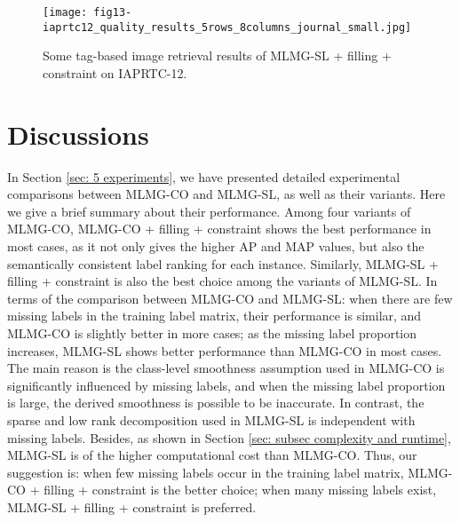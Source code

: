 \documentclass[twocolumn]{svjour3}          %
\begin{document}
\begin{figure*}[phtb]
\centering
\texttt{[image: fig13-iaprtc12\_quality\_results\_5rows\_8columns\_journal\_small.jpg]}
\vspace{-0.15in}
\caption{Some tag-based image retrieval results of MLMG-SL + filling + constraint on IAPRTC-12.}
\label{fig: quality results of image retrieval on iaprtc12}
\end{figure*}



\section{Discussions} \label{sec: discussion} 

In Section \ref{sec: 5 experiments}, we have presented detailed experimental comparisons between MLMG-CO and MLMG-SL, as well as their variants. 
Here we give a brief summary about their performance. 
%
Among four variants of MLMG-CO, MLMG-CO + filling + constraint shows the best performance in most cases, as it not only gives the higher AP and MAP values, but also the semantically consistent label ranking for each instance. 
Similarly, MLMG-SL + filling + constraint is also the best choice among the variants of MLMG-SL. 
%
In terms of the comparison between MLMG-CO and MLMG-SL:
when there are few missing labels in the training label matrix, their performance is similar, and MLMG-CO is slightly better in more cases; 
as the missing label proportion increases, MLMG-SL shows better performance than MLMG-CO in most cases. The main reason is the class-level smoothness assumption used in MLMG-CO is significantly influenced by missing labels, and when the missing label proportion is large, the derived smoothness is possible to be inaccurate. In contrast, the sparse and low rank decomposition used in MLMG-SL is independent with missing labels.  
Besides, as shown in Section \ref{sec: subsec complexity and runtime}, MLMG-SL is of the higher computational cost than MLMG-CO. 
%
Thus, our suggestion is: when few missing labels occur in the training label matrix, MLMG-CO + filling + constraint is the better choice; when many missing labels exist, MLMG-SL + filling + constraint is preferred. 
\end{document}
